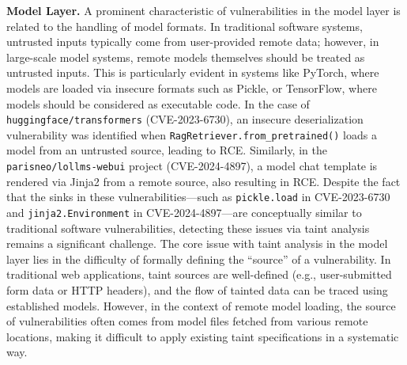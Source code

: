 
\noindent \textbf{Model Layer.}  
A prominent characteristic of vulnerabilities in the model layer is related to the handling of model formats. In traditional software systems, untrusted inputs typically come from user-provided remote data; however, in large-scale model systems, remote models themselves should be treated as untrusted inputs. This is particularly evident in systems like PyTorch, where models are loaded via insecure formats such as Pickle, or TensorFlow, where models should be considered as executable code. In the case of \texttt{huggingface/transformers} (CVE-2023-6730), an insecure deserialization vulnerability was identified when \texttt{RagRetriever.from\_pretrained()} loads a model from an untrusted source, leading to RCE. Similarly, in the \texttt{parisneo/lollms-webui} project (CVE-2024-4897), a model chat template is rendered via Jinja2 from a remote source, also resulting in RCE. Despite the fact that the sinks in these vulnerabilities—such as \texttt{pickle.load} in CVE-2023-6730 and \texttt{jinja2.Environment} in CVE-2024-4897—are conceptually similar to traditional software vulnerabilities, detecting these issues via taint analysis remains a significant challenge.
The core issue with taint analysis in the model layer lies in the difficulty of formally defining the ``source'' of a vulnerability. In traditional web applications, taint sources are well-defined (e.g., user-submitted form data or HTTP headers), and the flow of tainted data can be traced using established models. However, in the context of remote model loading, the source of vulnerabilities often comes from model files fetched from various remote locations, making it difficult to apply existing taint specifications in a systematic way.

